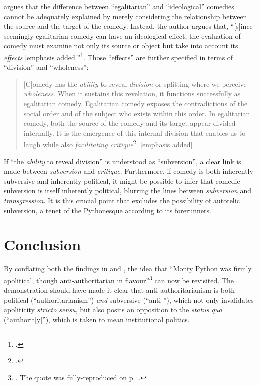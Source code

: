 \documentclass[
,a4paper
,DIV=12
,12pt
,abstract
,bibliography=totoc
]{scrartcl}
\begin{document}
\textcite[163]{mcgowan2017} argues that the difference between \enquote{egalitarian} and \enquote{ideological} comedies cannot be adequately explained by merely considering the relationship between the source and the target of the comedy.  Instead, the author argues that, \enquote{[s]ince seemingly egalitarian comedy can have an ideological effect, the evaluation of comedy must examine not only its source or object but take into account its \emph{effects} [emphasis added]}\footnote{\Cite[164]{mcgowan2017}.}.  Those \enquote{effects} are further specified in terms of \enquote{division} and \enquote{wholeness}:

\begin{quote}
  [C]omedy has the \emph{ability} to reveal \emph{division} or splitting where we perceive \emph{wholeness}.  When it sustains this revelation, it functions successfully as egalitarian comedy.  Egalitarian comedy exposes the contradictions of the social order and of the subject who exists within this order.  In egalitarian comedy, both the source of the comedy and its target appear divided internally.  It is the emergence of this internal division that enables us to laugh while also \emph{facilitating critique}\footnote{\Cite[164]{mcgowan2017}.}.  [emphasis added]
\end{quote}
If \enquote{the \emph{ability} to reveal division} is understood as \enquote{subversion}, a clear link is made between \emph{subversion} and \emph{critique}.  Furthermore, if comedy is both inherently subversive and inherently political, it might be possible to infer that comedic subversion is itself inherently political, blurring the lines between \emph{subversion} and \emph{transgression}.  It is this crucial point that excludes the possibility of autotelic subversion, a tenet of the Pythonesque according to its forerunners.

\section*{Conclusion}
By conflating both the findings in \textcite{declercq2018} and \textcite{mcgowan2017}, the idea that \enquote{Monty Python was firmly apolitical, though anti-authoritarian in flavour}\footnote{\Cite[42]{clifford1989}.  The quote was fully-reproduced on p.~\pageref{quote-anti-authoritarian}.} can now be revisited.  The demonstration should have made it clear that anti-authoritarianism is both political (\enquote{authoritarianism}) \emph{and} subversive (\enquote{anti-}), which not only invalidates apoliticity \emph{stricto sensu}, but also posits an opposition to the \emph{status quo} (\enquote{authorit[y]}), which is taken to mean institutional politics.
\end{document}
